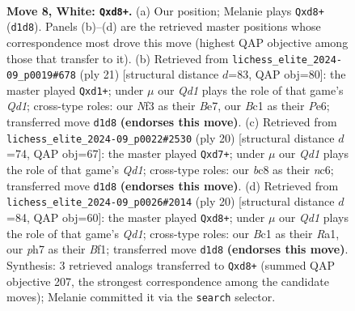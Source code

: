 \documentclass[11pt]{article}
\begin{document}
\begin{figure}[p]\centering
\begin{subfigure}{0.46\textwidth}\centering
\resizebox{\linewidth}{!}{%
\newchessgame
\chessboard[
  setfen={rnbqk2r/1p3ppp/p3pn2/2b5/2B5/4PN2/PP3PPP/RNBQ1RK1 w kq - 0 8},
  showmover=false,
  pgfstyle=straightmove, color=movearrow, markmove={d1-d8}
]}
\caption{}
\end{subfigure}\hfill
\begin{subfigure}{0.46\textwidth}\centering
\resizebox{\linewidth}{!}{%
\newchessgame
\chessboard[
  setfen={rn1q1rk1/pb2bppp/1p2pn2/8/2N5/PP2PN2/1B2BPPP/R2QK2R b KQ - 0 11},
  showmover=false,
  pgfstyle=straightmove, color=movearrow, markmove={d8-d1}
]}
\caption{}
\end{subfigure}
\\[4pt]
\begin{subfigure}{0.46\textwidth}\centering
\resizebox{\linewidth}{!}{%
\newchessgame
\chessboard[
  setfen={r3k2r/1p1q1ppp/p1n1pn2/2b5/8/4P3/PP2BPPP/RNBQ1RK1 w kq - 0 11},
  showmover=false,
  pgfstyle=straightmove, color=movearrow, markmove={d1-d7}
]}
\caption{}
\end{subfigure}\hfill
\begin{subfigure}{0.46\textwidth}\centering
\resizebox{\linewidth}{!}{%
\newchessgame
\chessboard[
  setfen={r2qkb1r/pp3pp1/2p2n2/5b1p/4p3/1PN1P3/PBP2PPP/R2QKB1R w KQkq - 0 11},
  showmover=false,
  pgfstyle=straightmove, color=movearrow, markmove={d1-d8}
]}
\caption{}
\end{subfigure}
\caption{\textbf{Move 8, White: \texttt{Qxd8+}.} (a) Our position; Melanie plays \texttt{Qxd8+} (\texttt{d1d8}). Panels (b)--(d) are the retrieved master positions whose correspondence most drove this move (highest QAP objective among those that transfer to it). (b) Retrieved from \texttt{lichess\_elite\_2024-09\_p0019\#678} (ply 21) [structural distance $d$=83, QAP obj=80]: the master played \texttt{Qxd1+}; under $\mu$ our \emph{Qd1} plays the role of that game's \emph{Qd1}; cross-type roles: our \emph{N}f3 as their \emph{B}e7, our \emph{B}c1 as their \emph{P}e6; transferred move \texttt{d1d8} \textbf{(endorses this move)}. (c) Retrieved from \texttt{lichess\_elite\_2024-09\_p0022\#2530} (ply 20) [structural distance $d$=74, QAP obj=67]: the master played \texttt{Qxd7+}; under $\mu$ our \emph{Qd1} plays the role of that game's \emph{Qd1}; cross-type roles: our \emph{b}c8 as their \emph{n}c6; transferred move \texttt{d1d8} \textbf{(endorses this move)}. (d) Retrieved from \texttt{lichess\_elite\_2024-09\_p0026\#2014} (ply 20) [structural distance $d$=84, QAP obj=60]: the master played \texttt{Qxd8+}; under $\mu$ our \emph{Qd1} plays the role of that game's \emph{Qd1}; cross-type roles: our \emph{B}c1 as their \emph{R}a1, our \emph{p}h7 as their \emph{B}f1; transferred move \texttt{d1d8} \textbf{(endorses this move)}. Synthesis: 3 retrieved analogs transferred to \texttt{Qxd8+} (summed QAP objective 207, the strongest correspondence among the candidate moves); Melanie committed it via the \texttt{search} selector.}
\label{fig:thought-m14}
\end{figure}
\end{document}
